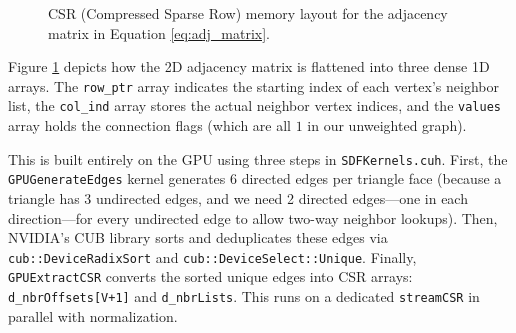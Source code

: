 \begin{figure}[H]
\centering
{}
\caption{CSR (Compressed Sparse Row) memory layout for the adjacency matrix in Equation \ref{eq:adj_matrix}.}
\label{fig:csr_layout}
\end{figure}

Figure \ref{fig:csr_layout} depicts how the 2D adjacency matrix is flattened into three dense 1D arrays. The \texttt{row\_ptr} array indicates the starting index of each vertex's neighbor list, the \texttt{col\_ind} array stores the actual neighbor vertex indices, and the \texttt{values} array holds the connection flags (which are all $1$ in our unweighted graph).

This is built entirely on the GPU using three steps in \texttt{SDFKernels.cuh}. First, the \texttt{GPUGenerateEdges} kernel generates 6 directed edges per triangle face (because a triangle has 3 undirected edges, and we need 2 directed edges---one in each direction---for every undirected edge to allow two-way neighbor lookups). Then, NVIDIA's CUB library sorts and deduplicates these edges via \texttt{cub::DeviceRadixSort} and \texttt{cub::DeviceSelect::Unique}. Finally, \texttt{GPUExtractCSR} converts the sorted unique edges into CSR arrays: \texttt{d\_nbrOffsets[V+1]} and \texttt{d\_nbrLists}. This runs on a dedicated \texttt{streamCSR} in parallel with normalization.

